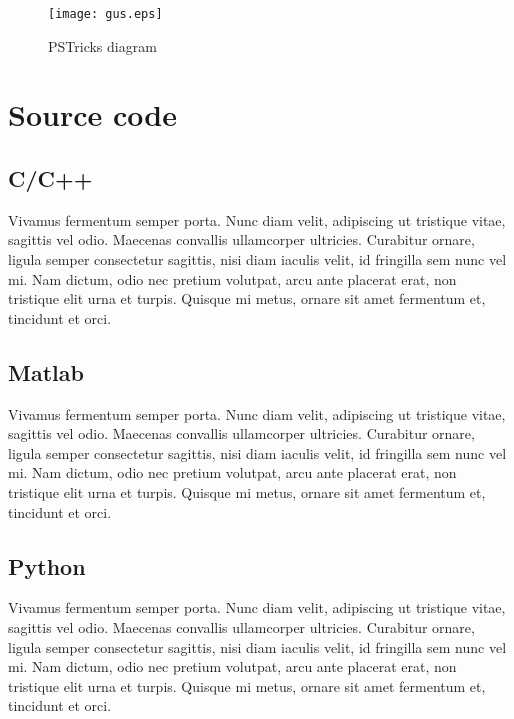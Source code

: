 \documentclass[12pt,a4paper,twoside]{article}
\begin{document}
\begin{figure}[htb]
  \begin{center}
    \texttt{[image: gus.eps]}
    \caption{PSTricks diagram}
  \end{center}
\end{figure}


\section{Source code}
\subsection{C/C++}

Vivamus fermentum semper porta. Nunc diam velit, adipiscing ut tristique
vitae, sagittis vel odio. Maecenas convallis ullamcorper ultricies.
Curabitur ornare, ligula semper consectetur sagittis, nisi diam iaculis
velit, id fringilla sem nunc vel mi. Nam dictum, odio nec pretium
volutpat, arcu ante placerat erat, non tristique elit urna et turpis.
Quisque mi metus, ornare sit amet fermentum et, tincidunt et orci. 


\subsection{Matlab}

Vivamus fermentum semper porta. Nunc diam velit, adipiscing ut tristique
vitae, sagittis vel odio. Maecenas convallis ullamcorper ultricies.
Curabitur ornare, ligula semper consectetur sagittis, nisi diam iaculis
velit, id fringilla sem nunc vel mi. Nam dictum, odio nec pretium
volutpat, arcu ante placerat erat, non tristique elit urna et turpis.
Quisque mi metus, ornare sit amet fermentum et, tincidunt et orci. 


\subsection{Python}

Vivamus fermentum semper porta. Nunc diam velit, adipiscing ut tristique
vitae, sagittis vel odio. Maecenas convallis ullamcorper ultricies.
Curabitur ornare, ligula semper consectetur sagittis, nisi diam iaculis
velit, id fringilla sem nunc vel mi. Nam dictum, odio nec pretium
volutpat, arcu ante placerat erat, non tristique elit urna et turpis.
Quisque mi metus, ornare sit amet fermentum et, tincidunt et orci. 
\end{document}
